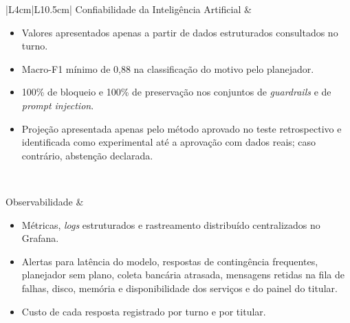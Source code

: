{\begin{longtable}{|L{4cm}|L{10.5cm}|}
Confiabilidade da Inteligência Artificial &
\begin{minipage}[t]{\linewidth}
\begin{itemize}[noitemsep,topsep=2pt,leftmargin=*]
    \item Valores apresentados apenas a partir de dados estruturados consultados no turno.
    \item Macro-F1 mínimo de 0,88 na classificação do motivo pelo planejador.
    \item 100\% de bloqueio e 100\% de preservação nos conjuntos de \textit{guardrails} e de \textit{prompt injection}.
    \item Projeção apresentada apenas pelo método aprovado no teste retrospectivo e identificada como experimental até a aprovação com dados reais; caso contrário, abstenção declarada.
\end{itemize}
\end{minipage} \\ \hline

Observabilidade &
\begin{minipage}[t]{\linewidth}
\begin{itemize}[noitemsep,topsep=2pt,leftmargin=*]
    \item Métricas, \textit{logs} estruturados e rastreamento distribuído centralizados no Grafana.
    \item Alertas para latência do modelo, respostas de contingência frequentes, planejador sem plano, coleta bancária atrasada, mensagens retidas na fila de falhas, disco, memória e disponibilidade dos serviços e do painel do titular.
    \item Custo de cada resposta registrado por turno e por titular.
\end{itemize}
\end{minipage} \\ \hline

\end{longtable}
}
